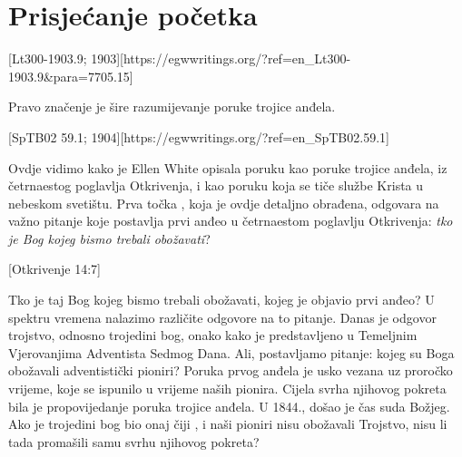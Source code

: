 \chapter{Prisjećanje početka} \label{chap:remembering-the-beginning}

[Lt300-1903.9; 1903][https://egwwritings.org/?ref=en\_Lt300-1903.9&para=7705.15]

Pravo značenje  je šire razumijevanje poruke trojice anđela.

[SpTB02 59.1; 1904][https://egwwritings.org/?ref=en\_SpTB02.59.1]

Ovdje vidimo kako je Ellen White opisala poruku  kao poruke trojice anđela, iz četrnaestog poglavlja Otkrivenja, i kao poruku koja se tiče službe Krista u nebeskom svetištu. Prva točka , koja je ovdje detaljno obrađena, odgovara na važno pitanje koje postavlja prvi anđeo u četrnaestom poglavlju Otkrivenja: \textit{tko je Bog kojeg bismo trebali obožavati}?

[Otkrivenje 14:7]

Tko je taj Bog kojeg bismo trebali obožavati, kojeg je objavio prvi anđeo? U spektru vremena nalazimo različite odgovore na to pitanje. Danas je odgovor trojstvo, odnosno trojedini bog, onako kako je predstavljeno u Temeljnim Vjerovanjima Adventista Sedmog Dana. Ali, postavljamo pitanje: kojeg su Boga obožavali adventistički pioniri? Poruka prvog anđela je usko vezana uz proročko vrijeme, koje se ispunilo u vrijeme naših pionira. Cijela svrha njihovog pokreta bila je propovijedanje poruka trojice anđela. U 1844., došao je čas suda Božjeg. Ako je trojedini bog bio onaj čiji , i naši pioniri nisu obožavali Trojstvo, nisu li tada promašili samu svrhu njihovog pokreta?

